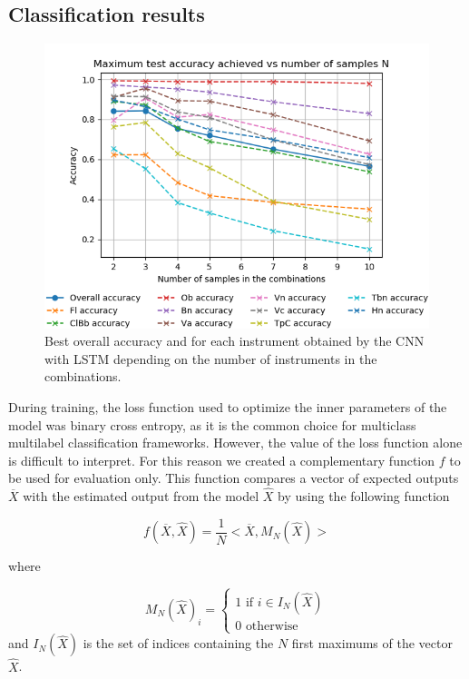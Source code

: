 \documentclass{article}
\begin{document}
\subsection{Classification results}

\begin{figure}
\begin{center}
\includegraphics[scale=0.4]{figs/Acc_vs_N_CNN.png}
\caption{Best overall accuracy and for each instrument obtained by the CNN with LSTM depending on the number of instruments in the combinations. \label{best_acc_cnn}}
\end{center}
\end{figure}

During training, the loss function used to optimize the inner parameters of the model was binary cross entropy, as it is the common choice for multiclass multilabel classification frameworks. However, the value of the loss function alone is difficult to interpret. For this reason we created a complementary function $f$ to be used for evaluation only. This function compares a vector of expected outputs $\overline{X}$ with the estimated output from the model $\hat{X}$ by using the following function

\begin{equation}
f(\overline{X}, \hat{X}) = \frac{1}{N}<\overline{X}, M_N(\hat{X})>
\label{eval}
\end{equation}

where

\begin{equation}
M_N(\hat{X})_i = \left\{\begin{array}{ll}
1 \text{ if } i \in I_N(\hat{X})\\
0 \text{ otherwise}
\end{array}\right.
\label{NMax}
\end{equation}
and $I_N(\hat{X})$ is the set of indices containing the $N$ first maximums of the vector $\hat{X}$.
\end{document}
